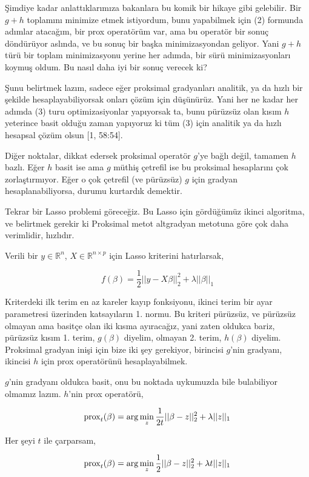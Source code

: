 \documentclass[12pt,fleqn]{article}\usepackage{../../common}
\begin{document}
Şimdiye kadar anlattıklarımıza bakanlara bu komik bir hikaye gibi
gelebilir. Bir $g + h$ toplamını minimize etmek istiyordum, bunu yapabilmek
için (2) formunda adımlar atacağım, bir prox operatörüm var, ama bu
operatör bir sonuç döndürüyor aslında, ve bu sonuç bir başka
minimizasyondan geliyor. Yani $g + h$ türü bir toplam minimizasyonu yerine
her adımda, bir sürü minimizasyonları koymuş oldum. Bu nasıl daha iyi bir
sonuç verecek ki?

Şunu belirtmek lazım, sadece eğer proksimal gradyanları analitik, ya da
hızlı bir şekilde hesaplayabiliyorsak onları çözüm için düşünürüz. Yani her
ne kadar her adımda (3) turu optimizasiyonlar yapıyorsak ta, bunu pürüzsüz
olan kısım $h$ yeterince basit olduğu zaman yapıyoruz ki tüm (3) için
analitik  ya da hızlı hesapsal çözüm olsun [1, 58:54]. 

Diğer noktalar, dikkat edersek proksimal operatör $g$'ye bağlı değil,
tamamen $h$ bazlı. Eğer $h$ basit ise ama $g$ müthiş çetrefil ise bu
proksimal hesaplarını çok zorlaştırmıyor. Eğer o çok çetrefil (ve pürüzsüz)
$g$ için gradyan hesaplanabiliyorsa, durumu kurtardık demektir. 

Tekrar bir Lasso problemi göreceğiz. Bu Lasso için gördüğümüz ikinci
algoritma, ve belirtmek gerekir ki Proksimal metot altgradyan metotuna göre
çok daha verimlidir, hızlıdır.

Verili bir $y \in \mathbb{R}^n$, $X \in \mathbb{R}^{n \times p}$ için Lasso
kriterini hatırlarsak, 

$$
f(\beta) = \frac{1}{2} || y - X \beta ||_2^2 + \lambda ||\beta||_1 
$$

Kriterdeki ilk terim en az kareler kayıp fonksiyonu, ikinci terim bir ayar
parametresi üzerinden katsayıların 1. normu. Bu kriteri pürüzsüz, ve
pürüzsüz olmayan ama basitçe olan iki kısma ayıracağız, yani zaten oldukca
bariz, pürüzsüz kısım 1. terim, $g(\beta)$ diyelim, olmayan 2. terim,
$h(\beta)$ diyelim. Proksimal gradyan inişi için bize iki şey gerekiyor,
birincisi $g$'nin gradyanı, ikincisi $h$ için prox operatörünü
hesaplayabilmek.

$g$'nin gradyanı oldukca basit, onu bu noktada uykumuzda bile bulabiliyor
olmamız lazım. $h$'nin prox operatörü,

$$
\operatorname{prox}_t(\beta) = \arg\min_z \frac{1}{2t} ||\beta-z||_2^2 + \lambda ||z||_1
$$

Her şeyi $t$ ile çarparsam,

$$
\operatorname{prox}_t(\beta) = \arg\min_z \frac{1}{2} ||\beta-z||_2^2 + \lambda t ||z||_1
$$
\end{document}

